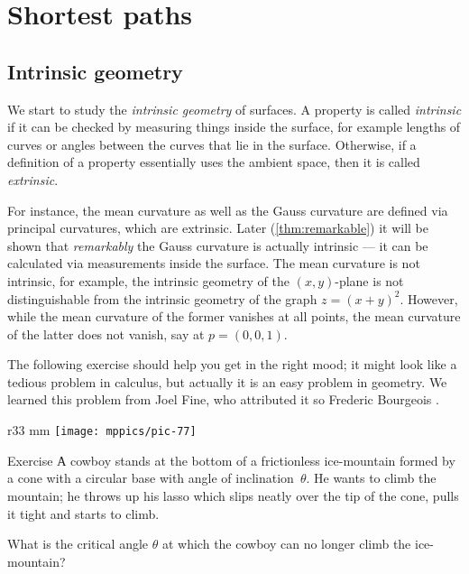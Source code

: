 \chapter{Shortest paths}

\section{Intrinsic geometry}

We start to study the \emph{intrinsic geometry} of surfaces.
A property is called \emph{intrinsic} if it can be checked by measuring things inside the surface, for example lengths of curves or angles between the curves that lie in the surface.
Otherwise, if a definition of a property essentially uses the ambient space, then it is called \emph{extrinsic}.

For instance, the mean curvature as well as the Gauss curvature are defined via principal curvatures, which are extrinsic.
Later (\ref{thm:remarkable}) it will be shown that \emph{remarkably} the Gauss curvature is actually intrinsic --- it can be calculated via measurements inside the surface.
The mean curvature is not intrinsic, for example, the intrinsic geometry of the $(x,y)$-plane is not distinguishable from the intrinsic geometry of the graph $z=(x+y)^2$. However,
while the mean curvature of the former vanishes at all points, the mean curvature of the latter does not vanish, say at $p=(0,0,1)$.  

The following exercise should help you get in the right mood;
it might look like a tedious problem in calculus, but actually it is an easy problem in geometry.
We learned this problem from Joel Fine, who attributed it so Frederic Bourgeois \cite{fine}.

\begin{wrapfigure}[6]{r}{33 mm}
\vskip-6mm
\centering
\texttt{[image: mppics/pic-77]}
\vskip-0mm
\end{wrapfigure}

\begin{thm}{Exercise}\label{ex:lasso}
А cowboy stands at the bottom of a frictionless ice-mountain formed by a cone with a circular base with  angle  of inclination~$\theta$.
He wants to climb the mountain;
he throws up his lasso which slips neatly over the tip of the cone, pulls it tight and starts to climb.

What is the critical angle $\theta$ at which the cowboy can no longer climb the ice-mountain?
\end{thm}

